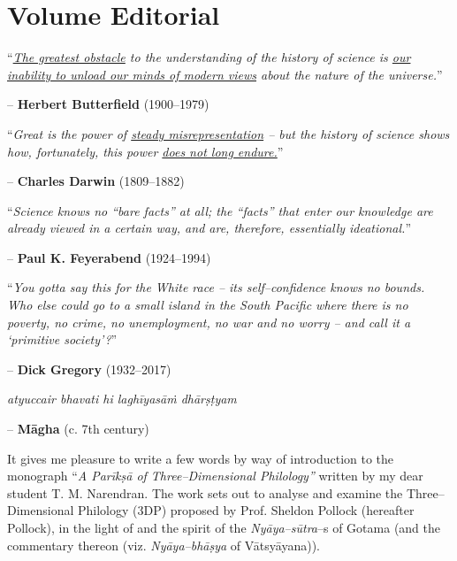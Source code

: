 
\chapter*{Volume Editorial}

“\textit{\underline{The greatest obstacle} to the understanding of the history of science is \underline{our inability to unload our minds of modern views} about the nature of the universe.}”

\begin{flushright}
– \textbf{Herbert Butterfield} (1900–1979)
\end{flushright}

“\textit{Great is the power of \underline{steady misrepresentation} – but the history of science shows how, fortunately, this power \underline{does not long endure.}}”

\begin{flushright}
– \textbf{Charles Darwin} (1809–1882)
\end{flushright}

“\textit{Science knows no “bare facts” at all; the “facts” that enter our knowledge are already viewed in a certain way, and are, therefore, essentially ideational.}”

\begin{flushright}
– \textbf{Paul K. Feyerabend }(1924–1994)
\end{flushright}

“\textit{You gotta say this for the White race – its self–confidence knows no bounds. Who else could go to a small island in the South Pacific where there is no poverty, no crime, no unemployment, no war and no worry – and call it a ‘primitive society’?}”

\begin{flushright}
– \textbf{Dick Gregory }(1932–2017)
\end{flushright}

\textit{atyuccair bhavati hi laghīyasāṁ dhārṣṭyam}

\begin{flushright}
– \textbf{Māgha} (c. 7th century)
\end{flushright}

It gives me pleasure to write a few words by way of introduction to the monograph “\textit{A Parīkṣā of Three–Dimensional Philology”} written by my dear student T. M. Narendran. The work sets out to analyse and examine the Three–Dimensional Philology (3DP) proposed by Prof. Sheldon Pollock (hereafter Pollock), in the light of and the spirit of the \textit{Nyāya–sūtra}–s of Gotama (and the commentary thereon (viz. \textit{Nyāya–bhāṣya} of Vātsyāyana)).

